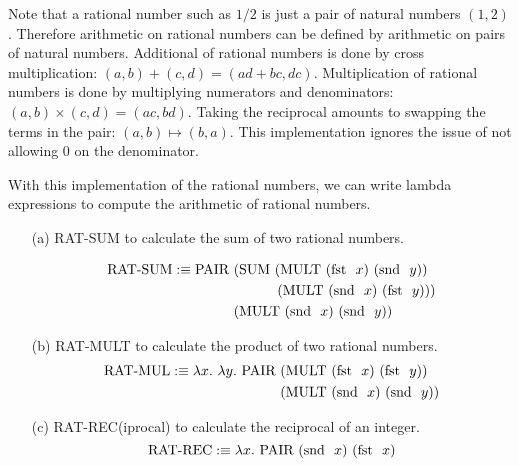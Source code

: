 \documentclass[11pt]{report}
\begin{document}
\begin{enumerate}
	Note that a rational number such as $1/2$ is just a pair of natural numbers $(1,2)$. Therefore arithmetic on rational numbers can be defined by arithmetic on pairs of natural numbers. Additional of rational numbers is done by cross multiplication: $(a,b)+(c,d) = (ad + bc, dc)$. Multiplication of rational numbers is done by multiplying numerators and denominators: $(a,b)\times(c,d) = (ac,bd)$. Taking the reciprocal amounts to swapping the terms in the pair: $(a,b) \mapsto (b,a)$. This implementation ignores the issue of not allowing 0 on the denominator.
	
	With this implementation of the rational numbers, we can write lambda expressions to compute the arithmetic of rational numbers.
	
		\begin{itemize}
			\item[(a)] RAT-SUM to calculate the sum of two rational numbers.
			
			\begin{align*}
				\text{RAT-SUM} :\equiv \PAIR \ &(\SUM \ (\MULT \ (\fst \ x) \ (\snd \ y)) \\ 
				&\hspace{11mm} (\MULT \ (\snd \ x) \ (\fst \ y))) \\
				&(\MULT \ (\snd \ x) \ (\snd \ y))			
			\end{align*}
						
			\item[(b)] RAT-MULT to calculate the product of two rational numbers.
			\begin{align*}
			\text{RAT-MUL} :\equiv \lambda x. \ \lambda y. \ \PAIR \ &(\MULT \ (\fst \ x) \ (\fst \ y)) \\ 
			&(\MULT \ (\snd \ x) \ (\snd \ y))			
			\end{align*}
			
			\item[(c)] RAT-REC(iprocal) to calculate the reciprocal of an integer.			
			$$\text{RAT-REC} :\equiv \lambda x. \ \text{PAIR} \ (\text{snd } \ x) \ (\text{fst } \ x)$$
		\end{itemize}

%	

\end{enumerate}
	
\end{document}
